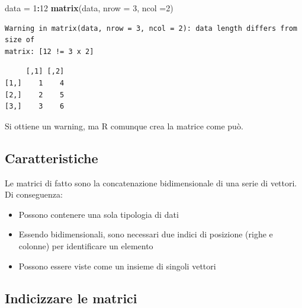 \documentclass[
  a4paper,
  DIV=11,
  numbers=noendperiod]{scrreprt}
\newenvironment{Shaded}{\begin{snugshade}}{\end{snugshade}}
\newcommand{\AttributeTok}[1]{\textcolor[rgb]{0.13,0.29,0.53}{#1}}
\newcommand{\DecValTok}[1]{\textcolor[rgb]{0.00,0.00,0.81}{#1}}
\newcommand{\FunctionTok}[1]{\textcolor[rgb]{0.13,0.29,0.53}{\textbf{#1}}}
\newcommand{\NormalTok}[1]{#1}
\newcommand{\OtherTok}[1]{\textcolor[rgb]{0.56,0.35,0.01}{#1}}
\newcommand{\SpecialCharTok}[1]{\textcolor[rgb]{0.81,0.36,0.00}{\textbf{#1}}}
\providecommand{\tightlist}{%
  \setlength{\itemsep}{0pt}\setlength{\parskip}{0pt}}
\begin{document}
\begin{tcolorbox}[enhanced jigsaw, toprule=.15mm, left=2mm, leftrule=.75mm, breakable, coltitle=black, title={Il numero di celle NON è un moltiplicando della lunghezza del vettore}, bottomtitle=1mm, opacitybacktitle=0.6, toptitle=1mm, titlerule=0mm, bottomrule=.15mm, colframe=quarto-callout-note-color-frame, arc=.35mm, rightrule=.15mm, opacityback=0, colbacktitle=quarto-callout-note-color!10!white, colback=white]

\begin{Shaded}
\begin{Highlighting}[]
\NormalTok{data }\OtherTok{=} \DecValTok{1}\SpecialCharTok{:}\DecValTok{12}
\FunctionTok{matrix}\NormalTok{(data, }\AttributeTok{nrow =} \DecValTok{3}\NormalTok{, }\AttributeTok{ncol =}\DecValTok{2}\NormalTok{)}
\end{Highlighting}
\end{Shaded}

\begin{verbatim}
Warning in matrix(data, nrow = 3, ncol = 2): data length differs from size of
matrix: [12 != 3 x 2]
\end{verbatim}

\begin{verbatim}
     [,1] [,2]
[1,]    1    4
[2,]    2    5
[3,]    3    6
\end{verbatim}

Si ottiene un warning, ma R comunque crea la matrice come può.

\end{tcolorbox}

\subsection{Caratteristiche}\label{caratteristiche}

Le matrici di fatto sono la concatenazione bidimensionale di una serie
di vettori. Di conseguenza:

\begin{itemize}
\tightlist
\item
  Possono contenere una sola tipologia di dati
\item
  Essendo bidimensionali, sono necessari due indici di posizione (righe
  e colonne) per identificare un elemento
\item
  Possono essere viste come un insieme di singoli vettori
\end{itemize}

\subsection{Indicizzare le matrici}\label{indicizzare-le-matrici}
\end{document}
